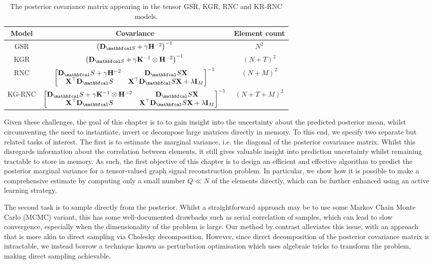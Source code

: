 \begin{table}[ht]
    \def\arraystretch{1.5}
    \centering
    \begin{tabular}{|c|c|c|}
    \hline
    \textbf{Model} & \textbf{Covariance} & \textbf{Element count}\\
    \hline
    GSR & $\left(\D_{\St} + \gamma \HH^{-2}\right)^{-1}$ & $ N^2 $\\ 
    \hline
    KGR & $\left(\D_{\St} + \gamma \K^{-1} \otimes \HH^{-2}\right)^{-1}$ & $(N + T)^2$\\ 
    \hline
    RNC & $\begin{bmatrix}
        \D_\St + \gamma \HH^{-2} & \D_\St  \X \\
        \X^\top \D_\St & \X^\top \D_\St \X + \lambda \I_M   
       \end{bmatrix}^{-1}$ & $(N + M)^2$ \\ 
    \hline
    KG-RNC & $\begin{bmatrix}
        \D_\St + \gamma \K^{-1} \otimes \HH^{-2} & \D_\St  \X \\
        \X^\top \D_\St & \X^\top \D_\St \X + \lambda \I_M   
       \end{bmatrix}^{-1}$ & $(N + T + M)^2$ \\
    \hline
\end{tabular}
\caption{The posterior covariance matrix appearing in the tensor GSR, KGR, RNC and KR-RNC models.}
\label{tab:post_cov}
\end{table}


Given these challenges, the goal of this chapter is to to gain insight into the uncertainty about the predicted posterior mean, whilst circumventing the need to instantiate, invert or decompose large matrices directly in memory. To this end, we specify two separate but related tasks of interest. The first is to estimate the marginal variance, i.e. the diagonal of the posterior covariance matrix. Whilst this disregards information about the correlation between elements, it still gives valuable insight into prediction uncertainty whilst remaining tractable to store in memory. As such, the first objective of this chapter is to design an efficient and effective algorithm to predict the posterior marginal variance for a tensor-valued graph signal reconstruction problem. In particular, we show how it is possible to make a comprehensive estimate by computing only a small number $Q \ll N$ of the elements directly, which can be further enhanced using an active learning strategy. 

The second task is to sample directly from the posterior. Whilst a straightforward approach may be to use some Markov Chain Monte Carlo (MCMC) variant, this has some well-documented drawbacks such as serial correlation of samples, which can lead to slow convergence, especially when the dimensionality of the problem is large. Our method by contrast alleviates this issue, with an approach that is more akin to direct sampling via Cholesky decomposition. However, since direct decomposition of the posterior covariance matrix is intractable, we instead borrow a technique known as perturbation optimisation which uses algebraic tricks to transform the problem, making direct sampling achievable. 

